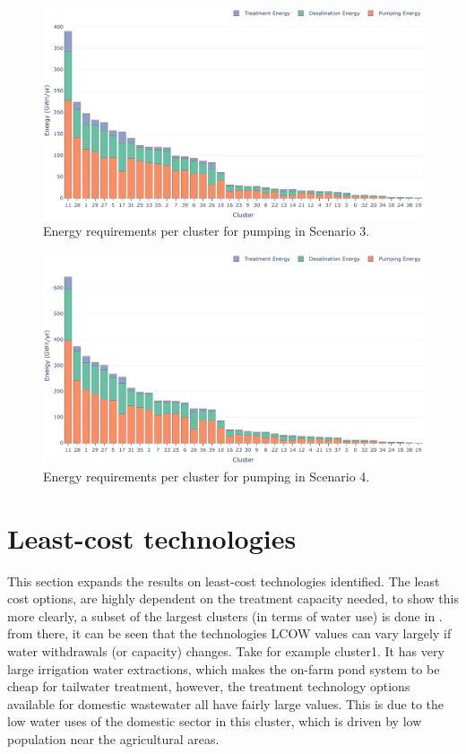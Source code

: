 \documentclass[12pt]{iopart}
\begin{document}
\begin{figure}[!h]
	\centering
	\includegraphics[width=\textwidth]{Scenario3Energy}
	\caption{Energy requirements per cluster for pumping in Scenario 3.}
	\label{fig:Scenario3Energy}
\end{figure}

\begin{figure}[!h]
	\centering
	\includegraphics[width=\textwidth]{Scenario4Energy}
	\caption{Energy requirements per cluster for pumping in Scenario 4.}
	\label{fig:Scenario4Energy}
\end{figure}


\clearpage
\section{Least-cost technologies}
This section expands the results on least-cost technologies identified. The least cost options, are highly dependent on the treatment capacity needed, to show this more clearly, a subset of the largest clusters (in terms of water use) is done in . from there, it can be seen that the technologies LCOW values can vary largely if water withdrawals (or capacity) changes. Take for example cluster1. It has very large irrigation water extractions, which makes the on-farm pond system to be cheap for tailwater treatment, however, the treatment technology options available for domestic wastewater all have fairly large values. This is due to the low water uses of the domestic sector in this cluster, which is driven by low population near the agricultural areas.
\end{document}
